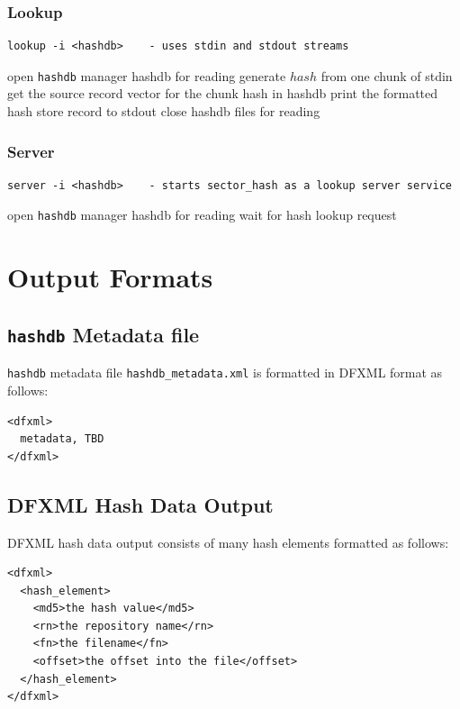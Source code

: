 \documentclass[10pt,twoside]{article}
\newcommand{\hdb}{\texttt{hashdb}\xspace}
\begin{document}
\subsubsection{Lookup}
\begin{small}
\begin{verbatim}
lookup -i <hashdb>    - uses stdin and stdout streams
\end{verbatim}
\end{small}
\begin{algorithmic}
\STATE open \hdb manager hashdb for reading
  \STATE generate $hash$ from one chunk of stdin
    \STATE get the source record vector for the chunk hash in hashdb
      \STATE print the formatted hash store record to stdout
    \ENDFOR
  \ENDIF
\ENDWHILE
\STATE close hashdb files for reading
\end{algorithmic}

\subsubsection{Server}
\begin{small}
\begin{verbatim}
server -i <hashdb>    - starts sector_hash as a lookup server service
\end{verbatim}
\end{small}
\begin{algorithmic}
\STATE open \hdb manager hashdb for reading
\WHILE{\TRUE}
  \STATE wait for hash lookup request
    \RETURN \TRUE
  \ELSE
    \RETURN \FALSE
  \ENDIF
\ENDWHILE
\end{algorithmic}

\section{Output Formats}
\subsection{\hdb Metadata file}
\hdb metadata file \texttt{hashdb\_metadata.xml}
is formatted in DFXML format as follows:
\begin{small}
\begin{verbatim}
<dfxml>
  metadata, TBD
</dfxml>
\end{verbatim}
\end{small}

\subsection{DFXML Hash Data Output}
DFXML hash data output consists of many hash elements formatted as follows:
\begin{small}
\begin{verbatim}
<dfxml>
  <hash_element>
    <md5>the hash value</md5>
    <rn>the repository name</rn>
    <fn>the filename</fn>
    <offset>the offset into the file</offset>
  </hash_element>
</dfxml>
\end{verbatim}
\end{small}
\end{document}
